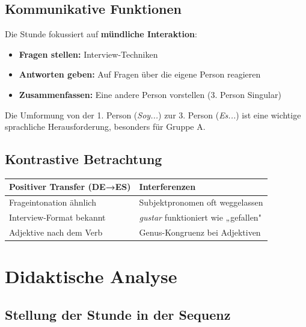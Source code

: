 \documentclass[11pt, a4paper]{article}
\newcommand{\es}[1]{\textcolor{spanisch}{\textit{#1}}}
\begin{document}
\subsection{Kommunikative Funktionen}

Die Stunde fokussiert auf \textbf{mündliche Interaktion}:
\begin{itemize}[leftmargin=2em]
    \item \textbf{Fragen stellen:} Interview-Techniken
    \item \textbf{Antworten geben:} Auf Fragen über die eigene Person reagieren
    \item \textbf{Zusammenfassen:} Eine andere Person vorstellen (3. Person Singular)
\end{itemize}

Die Umformung von der 1. Person (\es{Soy...}) zur 3. Person (\es{Es...}) ist eine wichtige sprachliche Herausforderung, besonders für Gruppe A.

\subsection{Kontrastive Betrachtung}

\begin{center}
\begin{tabular}{|p{5cm}|p{5cm}|}
    \hline
    \textbf{Positiver Transfer (DE→ES)} & \textbf{Interferenzen} \\
    \hline
    Frageintonation ähnlich & Subjektpronomen oft weggelassen \\
    Interview-Format bekannt & \es{gustar} funktioniert wie „gefallen" \\
    Adjektive nach dem Verb & Genus-Kongruenz bei Adjektiven \\
    \hline
\end{tabular}
\end{center}


\section{Didaktische Analyse}

\subsection{Stellung der Stunde in der Sequenz}
\end{document}

